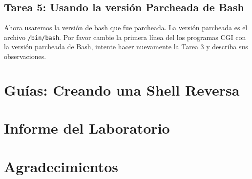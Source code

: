 \subsection{Tarea 5: Usando la versión Parcheada de Bash}

Ahora usaremos la versión de bash que fue parcheada. La versión parcheada es el archivo \texttt{/bin/bash}.
Por favor cambie la primera línea del los programas CGI con la versión parcheada de Bash, intente hacer nuevamente la Tarea 3 y describa sus observaciones.


\section{Guías: Creando una Shell Reversa}
\label{shellshock:sec:reverseshell}






\section{Informe del Laboratorio}




\section*{Agradecimientos}





